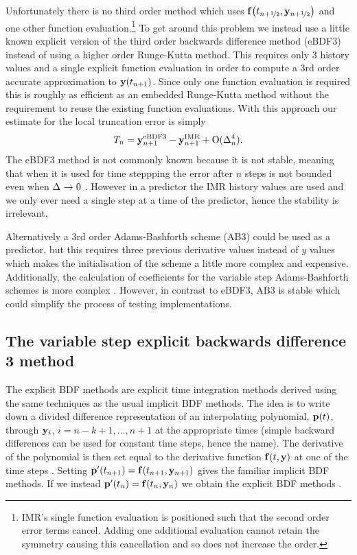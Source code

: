 Unfortunately there is no third order method which uses ${\mathbf{f}{\left( t_{n+\nicefrac{1}{2}}, \mathbf{y}_{n+\nicefrac{1}{2}} \right)}}$ and one other function evaluation.\footnote{IMR's single function evaluation is positioned such that the second order error terms cancel. Adding one additional evaluation cannot retain the symmetry causing this cancellation and so does not increase the order.}
To get around this problem we instead use a little known explicit version of the third order backwards difference method (eBDF3) instead of using a higher order Runge-Kutta method.
This requires only 3 history values and a single explicit function evaluation in order to compute a 3rd order accurate approximation to $\mathbf{y}(t_{n+1})$.
Since only one function evaluation is required this is roughly as efficient as an embedded Runge-Kutta method without the requirement to reuse the existing function evaluations.
With this approach our estimate for the local truncation error is simply
\begin{equation}
  \label{eq:aimr-lte-est}
  T_n = \mathbf{y}_{n+1}^{\text{eBDF3}} - \mathbf{y}_{n+1}^{\text{IMR}} + \text{O}(\Delta_{n}^4).
\end{equation}
The eBDF3 method is not commonly known because it is not stable, meaning that when it is used for time steppping the error after $n$ steps is not bounded even when $\Delta_{} \rightarrow 0$ \cite[365]{HairerNorsettWanner}.
However in a predictor the IMR history values are used and we only ever need a single step at a time of the predictor, hence the stability is irrelevant.

Alternatively a 3rd order Adams-Bashforth scheme (AB3) could be used as a predictor, but this requires three previous derivative values instead of $y$ values which makes the initialisation of the scheme a little more complex and expensive.
Additionally, the calculation of coefficients for the variable step Adams-Bashforth schemes is more complex \cite[400]{HairerNorsettWanner}.
However, in contrast to eBDF3, AB3 is stable which could simplify the process of testing implementations.


\subsection{The variable step explicit backwards difference 3 method}

The explicit BDF methods are explicit time integration methods derived using the same techniques as the usual implicit BDF methods.
The idea is to write down a divided difference representation of an interpolating polynomial, ${\mathbf{p}}(t)$, through $\mathbf{y}_i$, $i=n-k+1, \ldots, n+1$ at the appropriate times (simple backward differences can be used for constant time steps, hence the name).
The derivative of the polynomial is then set equal to the derivative function ${\mathbf{f}{\left( t, \mathbf{y} \right)}}$ at one of the time steps \cite[400]{HairerNorsettWanner}.
Setting ${\mathbf{p}}'(t_{n+1}) = {\mathbf{f}{\left( t_{n+1}, \mathbf{y}_{n+1} \right)}}$ gives the familiar implicit BDF methods.
If we instead ${\mathbf{p}}'(t_{n}) = {\mathbf{f}{\left( t_{n}, \mathbf{y}_{n} \right)}}$ we obtain the explicit BDF methods \cite[364]{HairerNorsettWanner}.

